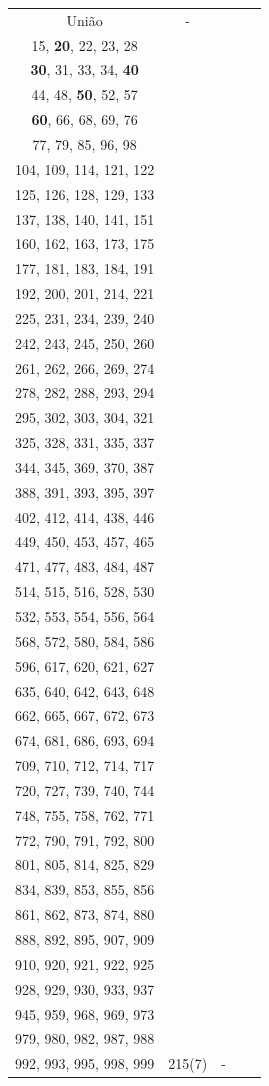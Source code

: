 ﻿\documentclass{article}
\begin{document}
\begin{longtable}{c|c|c|c|c}
União & - & \begin{tabular}[c]{@{}c@{}}\textbf{1}, 4, 6, \textbf{10}, 13\\15, \textbf{20}, 22, 23, 28\\\textbf{30}, 31, 33, 34, \textbf{40}\\44, 48, \textbf{50}, 52, 57\\\textbf{60}, 66, 68, 69, 76\\77, 79, 85, 96, 98\\104, 109, 114, 121, 122\\125, 126, 128, 129, 133\\137, 138, 140, 141, 151\\160, 162, 163, 173, 175\\177, 181, 183, 184, 191\\192, 200, 201, 214, 221\\225, 231, 234, 239, 240\\242, 243, 245, 250, 260\\261, 262, 266, 269, 274\\278, 282, 288, 293, 294\\295, 302, 303, 304, 321\\325, 328, 331, 335, 337\\344, 345, 369, 370, 387\\388, 391, 393, 395, 397\\402, 412, 414, 438, 446\\449, 450, 453, 457, 465\\471, 477, 483, 484, 487\\514, 515, 516, 528, 530\\532, 553, 554, 556, 564\\568, 572, 580, 584, 586\\596, 617, 620, 621, 627\\635, 640, 642, 643, 648\\662, 665, 667, 672, 673\\674, 681, 686, 693, 694\\709, 710, 712, 714, 717\\720, 727, 739, 740, 744\\748, 755, 758, 762, 771\\772, 790, 791, 792, 800\\801, 805, 814, 825, 829\\834, 839, 853, 855, 856\\861, 862, 873, 874, 880\\888, 892, 895, 907, 909\\910, 920, 921, 922, 925\\928, 929, 930, 933, 937\\945, 959, 968, 969, 973\\979, 980, 982, 987, 988\\992, 993, 995, 998, 999\end{tabular} & 215(7) & - \\

\end{longtable}
\end{document}
